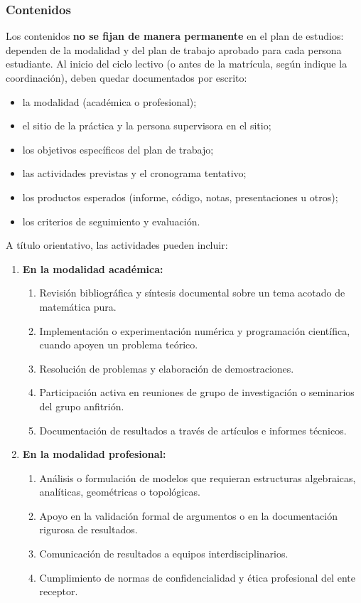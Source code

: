\begin{refsection}
\subsubsection*{Contenidos}

Los contenidos \textbf{no se fijan de manera permanente} en el plan de estudios: dependen de la modalidad y del plan de trabajo aprobado para cada persona estudiante. Al inicio del ciclo lectivo (o antes de la matrícula, según indique la coordinación), deben quedar documentados por escrito:

\begin{itemize}
\item la modalidad (académica o profesional);
\item el sitio de la práctica y la persona supervisora en el sitio;
\item los objetivos específicos del plan de trabajo;
\item las actividades previstas y el cronograma tentativo;
\item los productos esperados (informe, código, notas, presentaciones u otros);
\item los criterios de seguimiento y evaluación.
\end{itemize}

A título orientativo, las actividades pueden incluir:

\begin{enumerate}
\item \textbf{En la modalidad académica:}
\begin{enumerate}
    \item Revisión bibliográfica y síntesis documental sobre un tema acotado de matemática pura.
    \item Implementación o experimentación numérica y programación científica, cuando apoyen un problema teórico.
    \item Resolución de problemas y elaboración de demostraciones.
    \item Participación activa en reuniones de grupo de investigación o seminarios del grupo anfitrión.
    \item Documentación de resultados a través de artículos e informes técnicos.
\end{enumerate}

\item \textbf{En la modalidad profesional:}
\begin{enumerate}
    \item Análisis o formulación de modelos que requieran estructuras algebraicas, analíticas, geométricas o topológicas.
    \item Apoyo en la validación formal de argumentos o en la documentación rigurosa de resultados.
    \item Comunicación de resultados a equipos interdisciplinarios.
    \item Cumplimiento de normas de confidencialidad y ética profesional del ente receptor.
\end{enumerate}
\end{enumerate}


\end{refsection}
